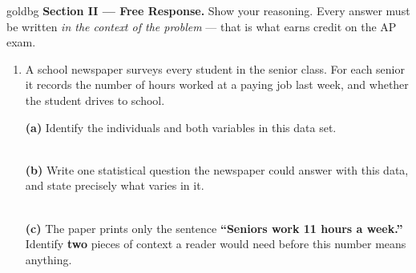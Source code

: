 \boxguard[16]
\begin{headlinebox}{goldbg}
\small
\textbf{Section II --- Free Response.} Show your reasoning. Every answer must be written
\emph{in the context of the problem} --- that is what earns credit on the AP exam.
\end{headlinebox}

\vspace{0.10in}

\begin{enumerate}[leftmargin=1.9em, itemsep=0.16in, resume]

  \item A school newspaper surveys every student in the senior class. For each senior it records
        the number of hours worked at a paying job last week, and whether the student drives to
        school.

        \boxguard[17]
        \vspace{6pt}
        \textbf{(a)} Identify the individuals and both variables in this data set.\\[4pt]
        \\

        \boxguard[17]
        \vspace{6pt}
        \textbf{(b)} Write one statistical question the newspaper could answer with this data,
        and state precisely what varies in it.\\[4pt]
        \\

        \boxguard[17]
        \vspace{6pt}
        \textbf{(c)} The paper prints only the sentence \textbf{``Seniors work 11 hours a week.''}
        Identify \textbf{two} pieces of context a reader would need before this number means
        anything.\\[4pt]
        \\


\end{enumerate}
